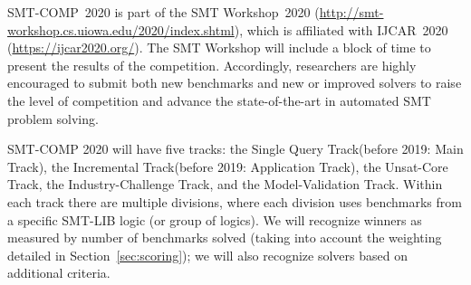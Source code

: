 \documentclass[12pt]{article}
\newcommand{\maintrack}{Single Query Track\xspace}
\newcommand{\inctrack}{Incremental Track\xspace}
\newcommand{\ucoretrack}{Unsat-Core Track\xspace}
\newcommand{\mvaltrack}{Model-Validation Track\xspace}
\newcommand{\challtrack}{Industry-Challenge Track\xspace}
\begin{document}
SMT-COMP~2020 is part of the SMT Workshop~2020
(\url{http://smt-workshop.cs.uiowa.edu/2020/index.shtml}),
which is affiliated with IJCAR~2020 (\url{https://ijcar2020.org/}).
The SMT Workshop will include a block of time to present the results of the
competition.
%
Accordingly, researchers are highly encouraged to submit both new
benchmarks and new or improved solvers to raise the level of
competition and advance the state-of-the-art in automated SMT problem
solving.

SMT-COMP 2020 will have five tracks: the \maintrack (before 2019: Main Track),
the \inctrack (before 2019: Application Track), the \ucoretrack,
the \challtrack, and the \mvaltrack.
%
Within each track there are multiple divisions, where each division
uses benchmarks from a specific SMT-LIB logic (or group of logics).
We will recognize winners as measured by number of benchmarks solved
(taking into account the weighting detailed in
Section~\ref{sec:scoring}); we will also recognize solvers based on
additional criteria.
\end{document}
